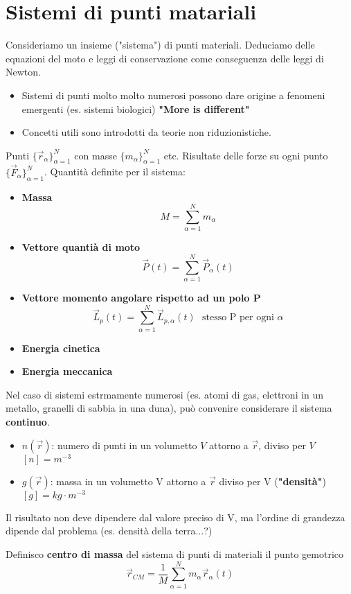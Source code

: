 \newpage
\section{Sistemi di punti matariali}
Consideriamo un insieme ("sistema") di punti materiali. Deduciamo delle equazioni del moto e leggi di conservazione 
come conseguenza delle leggi di Newton.
\begin{itemize}
    \item Sistemi di punti molto molto numerosi possono dare origine a fenomeni emergenti (es. sistemi biologici) \textbf{"More is different"}
    \item Concetti utili sono introdotti da teorie non riduzionistiche.
\end{itemize}
Punti $\{\vec{r}_{\alpha}\}^N_{\alpha=1}$ con masse $\{m_{\alpha}\}^N_{\alpha = 1}$ etc. Risultate delle forze su ogni punto $\{\vec{F}_{\alpha}\}^N_{\alpha = 1}$.
Quantità definite per il sistema:
\begin{itemize}
    \item \textbf{Massa} $$M = \sum_{\alpha = 1}^{N}m_{\alpha}$$
    \item \textbf{Vettore quantià di moto} $$\vec{P}(t) = \sum_{\alpha = 1}^{N} \vec{P}_{\alpha}(t)$$
    \item \textbf{Vettore momento angolare rispetto ad un polo P} $$\vec{L}_p(t) = \sum_{\alpha = 1}^{N}\vec{L}_{p, \alpha}(t) \:\:\: \text{stesso P per ogni }\alpha$$
    \item \textbf{Energia cinetica} %
    \item \textbf{Energia meccanica} %
\end{itemize}
Nel caso di sistemi estrmamente numerosi (es. atomi di gas, elettroni in un metallo, granelli di sabbia in una duna), può convenire
considerare il sistema \textbf{continuo}.
\begin{itemize}
    \item $n(\vec{r})$: numero di punti in un volumetto $V$ attorno a $\vec{r}$, diviso per $V$ $[n] = m^{-3}$
    \item $g(\vec{r})$: massa in un volumetto V attorno a $\vec{r}$ diviso per V (\textbf{"densità"}) $[g] = kg \cdot m^{-3}$
\end{itemize}
\begin{observation}
    Il risultato non deve dipendere dal valore preciso di V, ma l'ordine di grandezza dipende dal problema (es. densità della terra...?)
\end{observation}
\begin{definition}
    Definisco \textbf{centro di massa} del sistema di punti di materiali il punto gemotrico 
    $$\vec{r}_{CM} = \frac{1}{M}\sum_{\alpha = 1}^{N} m_{\alpha}\vec{r}_{\alpha}(t)$$
\end{definition}
